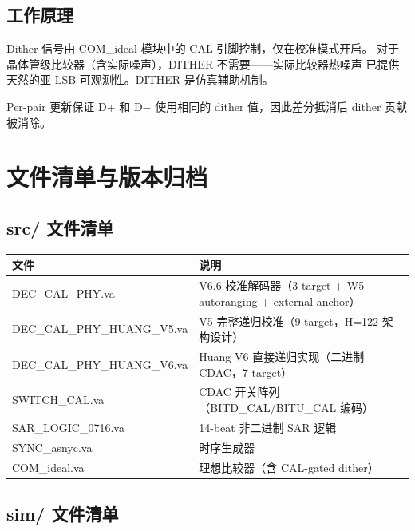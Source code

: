 \documentclass[UTF8,a4paper,12pt]{ctexart}
\theoremstyle{definition}
\begin{document}
\subsection{工作原理}

Dither 信号由 COM\_ideal 模块中的 CAL 引脚控制，仅在校准模式开启。
对于晶体管级比较器（含实际噪声），DITHER 不需要——实际比较器热噪声
已提供天然的亚 LSB 可观测性。DITHER 是仿真辅助机制。

Per-pair 更新保证 D+ 和 D$-$ 使用相同的 dither 值，因此差分抵消后
dither 贡献被消除。

\section{文件清单与版本归档}

\subsection{src/ 文件清单}

\begin{longtable}{p{5cm}p{9cm}}
\toprule
\textbf{文件} & \textbf{说明} \\
\midrule
\endhead
\bottomrule
\endfoot
DEC\_CAL\_PHY.va & V6.6 校准解码器（3-target + W5 autoranging + external anchor） \\
DEC\_CAL\_PHY\_HUANG\_V5.va & V5 完整递归校准（9-target，H=122 架构设计） \\
DEC\_CAL\_PHY\_HUANG\_V6.va & Huang V6 直接递归实现（二进制 CDAC，7-target） \\
SWITCH\_CAL.va & CDAC 开关阵列（BITD\_CAL/BITU\_CAL 编码） \\
SAR\_LOGIC\_0716.va & 14-beat 非二进制 SAR 逻辑 \\
SYNC\_asnyc.va & 时序生成器 \\
COM\_ideal.va & 理想比较器（含 CAL-gated dither） \\
\bottomrule
\end{longtable}

\subsection{sim/ 文件清单}
\end{document}
